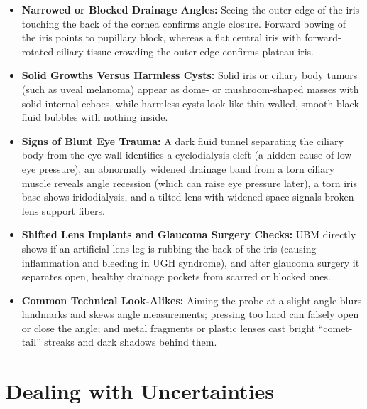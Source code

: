\begin{itemize}
    \item \textbf{Narrowed or Blocked Drainage Angles:} Seeing the outer edge of the iris touching the back of the cornea confirms angle closure. Forward bowing of the iris points to pupillary block, whereas a flat central iris with forward-rotated ciliary tissue crowding the outer edge confirms plateau iris.
    \item \textbf{Solid Growths Versus Harmless Cysts:} Solid iris or ciliary body tumors (such as uveal melanoma) appear as dome- or mushroom-shaped masses with solid internal echoes, while harmless cysts look like thin-walled, smooth black fluid bubbles with nothing inside.
    \item \textbf{Signs of Blunt Eye Trauma:} A dark fluid tunnel separating the ciliary body from the eye wall identifies a cyclodialysis cleft (a hidden cause of low eye pressure), an abnormally widened drainage band from a torn ciliary muscle reveals angle recession (which can raise eye pressure later), a torn iris base shows iridodialysis, and a tilted lens with widened space signals broken lens support fibers.
    \item \textbf{Shifted Lens Implants and Glaucoma Surgery Checks:} UBM directly shows if an artificial lens leg is rubbing the back of the iris (causing inflammation and bleeding in UGH syndrome), and after glaucoma surgery it separates open, healthy drainage pockets from scarred or blocked ones.
    \item \textbf{Common Technical Look-Alikes:} Aiming the probe at a slight angle blurs landmarks and skews angle measurements; pressing too hard can falsely open or close the angle; and metal fragments or plastic lenses cast bright ``comet-tail'' streaks and dark shadows behind them.
\end{itemize}

\section{Dealing with Uncertainties}

